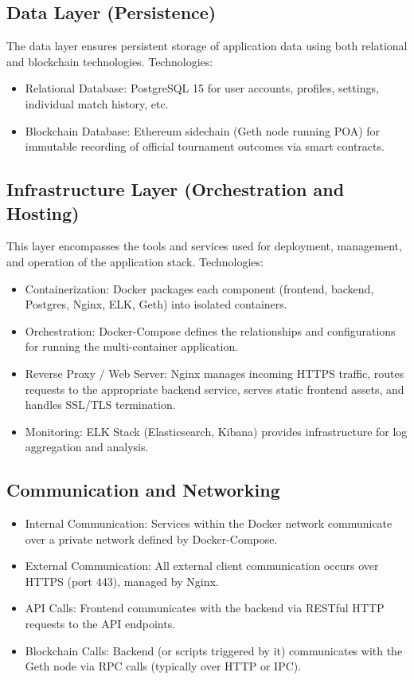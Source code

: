 \subsection*{Data Layer (Persistence)}
The data layer ensures persistent storage of application data using both relational and blockchain technologies. Technologies:
\begin{itemize}
    \item Relational Database: PostgreSQL 15 for user accounts, profiles, settings, individual match history, etc.
    \item Blockchain Database: Ethereum sidechain (Geth node running POA) for immutable recording of official tournament outcomes via smart contracts.
\end{itemize}

\subsection*{Infrastructure Layer (Orchestration and Hosting)}
This layer encompasses the tools and services used for deployment, management, and operation of the application stack. Technologies:
\begin{itemize}
    \item Containerization: Docker packages each component (frontend, backend, Postgres, Nginx, ELK, Geth) into isolated containers.
    \item Orchestration: Docker-Compose defines the relationships and configurations for running the multi-container application.
    \item Reverse Proxy / Web Server: Nginx manages incoming HTTPS traffic, routes requests to the appropriate backend service, serves static frontend assets, and handles SSL/TLS termination.
    \item Monitoring: ELK Stack (Elasticsearch, Kibana) provides infrastructure for log aggregation and analysis.
\end{itemize}

\subsection*{Communication and Networking}
\begin{itemize}
    \item Internal Communication: Services within the Docker network communicate over a private network defined by Docker-Compose.
    \item External Communication: All external client communication occurs over HTTPS (port 443), managed by Nginx.
    \item API Calls: Frontend communicates with the backend via RESTful HTTP requests to the API endpoints.
    \item Blockchain Calls: Backend (or scripts triggered by it) communicates with the Geth node via RPC calls (typically over HTTP or IPC).
\end{itemize}

